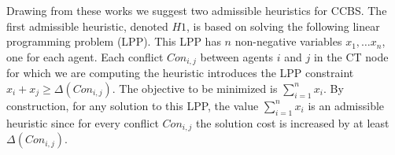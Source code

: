 \documentclass[letterpaper]{article} %
\newcommand\roni[1]{\nb{\textbf{Roni:}}{orange}{#1}}
\newcommand{\ccbs}{\ac{CCBS}\xspace}
\newcommand{\ct}{\ac{CT}\xspace}
\begin{document}
Drawing from these works we suggest two admissible heuristics for \ccbs. 
The first admissible heuristic, denoted $H1$, is based on solving the following linear programming problem (LPP). 
This LPP has $n$ non-negative variables $x_1,\ldots x_n$, one for each agent. 
Each conflict $Con_{i,j}$ between agents $i$ and $j$ 
in the \ct node for which we are computing the heuristic
introduces the LPP constraint $x_i + x_j \geq \Delta(Con_{i,j})$. 
The objective to be minimized is $\sum_{i=1}^n{x_i}$. 
By construction, for any solution to this LPP, the value $\sum_{i=1}^n{x_i}$ is an admissible heuristic since for every conflict $Con_{i,j}$ the solution cost is increased by at least $\Delta(Con_{i,j})$. 





\end{document}
